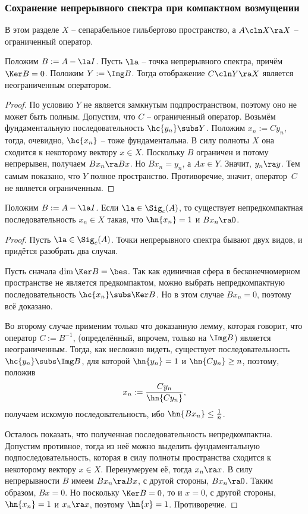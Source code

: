 \documentclass[a4paper]{article}
\begin{document}
\subsubsection{Сохранение непрерывного спектра при компактном возмущении}

В этом разделе $X$ -- сепарабельное гильбертово пространство, а
$A \cln X \ra X$ -- ограниченный оператор.

\begin{petit}
\begin{lemma}
Положим $B := A -\la I$. Пусть $\la$ -- точка непрерывного спектра, причём $\Ker B = 0$.
Положим $Y := \Img B$. Тогда отображение $C\cln Y \ra X$ является неограниченным оператором.
\end{lemma}
\begin{proof}
По условию $Y$ не является замкнутым подпространством, поэтому оно не может быть полным.
Допустим, что $C$ -- ограниченный оператор. Возьмём фундаментальную последовательность $\hc{y_n} \subs Y$.
Положим ${x_n := C y_n}$, тогда, очевидно, $\hc{x_n}$ -- тоже фундаментальна. В силу полноты $X$
она сходится к некоторому вектору $x \in X$. Поскольку $B$ ограничен и потому непрерывен,
получаем $Bx_n \ra Bx$. Но $B x_n = y_n$, а $Ax \in Y$. Значит, $y_n \ra y$. Тем самым показано, что $Y$
полное пространство. Противоречие, значит, оператор~$C$ не является ограниченным.
\end{proof}

\begin{lemma}
Положим $B := A - \la I$. Если $\la \in \Sig_c(A)$, то существует непредкомпактная
последовательность $x_n \in X$ такая, что $\hn{x_n} = 1$ и $B x_n \ra 0$.
\end{lemma}
\begin{proof}
Пусть $\la \in \Sig_c(A)$. Точки непрерывного спектра бывают двух видов, и придётся разобрать два случая.

Пусть сначала $\dim \Ker B = \bes$. Так как единичная сфера в бесконечномерном пространстве не
является предкомпактом, можно выбрать непредкомпактную последовательность $\hc{x_n} \subs \Ker B$.
Но в этом случае ${B x_n = 0}$, поэтому всё доказано.

Во второму случае применим только что доказанную лемму, которая говорит, что оператор $C := B^{-1}$,
(определённый, впрочем, только на $\Img B$) является неограниченным.
Тогда, как несложно видеть, существует последовательность $\hc{y_n} \subs \Img B$, для которой $\hn{y_n} = 1$ и
$\hn{C y_n} \ge n$, поэтому, положив
$$x_n := \frac{C y_n}{\hn{ Cy_n}},$$
получаем искомую последовательность, ибо
$\hn{B x_n} \le \frac{1}{n}$.

Осталось показать, что полученная последовательность непредкомпактна. Допустим противное,
тогда из неё можно выделить фундаментальную подпоследовательность, которая в силу полноты пространства
сходится к некоторому вектору $x \in X$. Перенумеруем её, тогда $x_n \ra x$.
В силу непрерывности $B$ имеем $B x_n \ra Bx$, с другой стороны, $Bx_n \ra 0$. Таким образом, $Bx = 0$.
Но поскольку $\Ker B = 0$, то и $x = 0$, с другой стороны, $\hn{x_n} = 1$ и $x_n \ra x$,
поэтому $\hn{x} = 1$. Противоречие.
\end{proof}
\end{petit}
\end{document}
